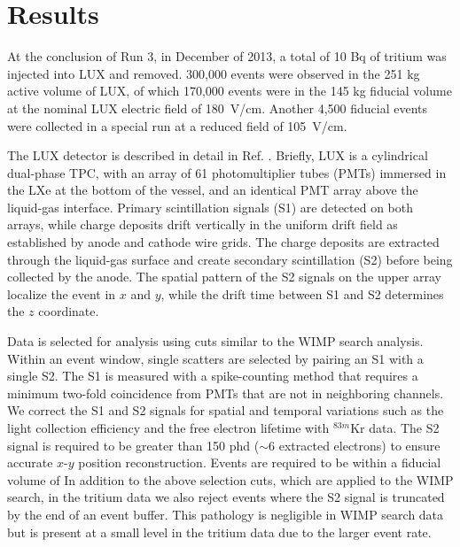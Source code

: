 \section{Results}

At the conclusion of Run 3, in December of 2013, a total of 10 Bq of tritium was injected into LUX and removed. 300,000 events were observed in the 251 kg active volume of LUX, of which 170,000 events were in the 145 kg fiducial volume at the nominal LUX electric field of 180~V/cm. Another 4,500 fiducial events were collected in a special run at a reduced field of 105~V/cm. 

The LUX detector is described in detail in Ref. \cite{lux-nim}. Briefly, LUX is a cylindrical dual-phase TPC, with an array of 61 photomultiplier tubes (PMTs) immersed in the LXe at the bottom of the vessel, and an identical PMT array above the liquid-gas interface. Primary scintillation signals (S1) are detected on both arrays, while charge deposits drift vertically in the uniform drift field as established by anode and cathode wire grids. The charge deposits are extracted through the liquid-gas surface and create secondary scintillation (S2) before being collected by the anode. The spatial pattern of the S2 signals on the upper array localize the event in $x$ and $y$, while the drift time between S1 and S2 determines the $z$ coordinate.

Data is selected for analysis using cuts similar to the WIMP search analysis\cite{lux-reanalysis, lux-prd}. Within an event window, single scatters are selected by pairing an S1 with a single S2.  The S1 is measured with a spike-counting method that requires a minimum two-fold coincidence from PMTs that are not in neighboring channels. We correct the S1 and S2 signals for spatial and temporal variations such as the light collection efficiency and the free electron lifetime with $ ^{83m}$Kr data.  The S2 signal is required to be greater than 150 phd ($\sim$6 extracted electrons) to ensure accurate $x$-$y$ position reconstruction. Events are required to be within a fiducial volume of  In addition to the above selection cuts, which are applied to the WIMP search, in the tritium data we also reject events where the S2 signal is truncated by the end of an event buffer. This pathology is negligible in WIMP search data but is present at a small level in the tritium data due to the larger event rate.


